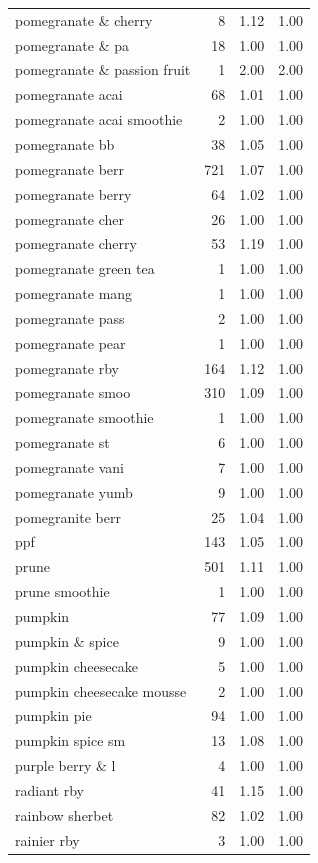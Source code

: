 \begin{table}
\begin{tabular}{lrrr}
pomegranate \& cherry & 8 & 1.12 & 1.00 \\
pomegranate \& pa & 18 & 1.00 & 1.00 \\
pomegranate \& passion fruit & 1 & 2.00 & 2.00 \\
pomegranate acai & 68 & 1.01 & 1.00 \\
pomegranate acai smoothie & 2 & 1.00 & 1.00 \\
pomegranate bb & 38 & 1.05 & 1.00 \\
pomegranate berr & 721 & 1.07 & 1.00 \\
pomegranate berry & 64 & 1.02 & 1.00 \\
pomegranate cher & 26 & 1.00 & 1.00 \\
pomegranate cherry & 53 & 1.19 & 1.00 \\
pomegranate green tea & 1 & 1.00 & 1.00 \\
pomegranate mang & 1 & 1.00 & 1.00 \\
pomegranate pass & 2 & 1.00 & 1.00 \\
pomegranate pear & 1 & 1.00 & 1.00 \\
pomegranate rby & 164 & 1.12 & 1.00 \\
pomegranate smoo & 310 & 1.09 & 1.00 \\
pomegranate smoothie & 1 & 1.00 & 1.00 \\
pomegranate st & 6 & 1.00 & 1.00 \\
pomegranate vani & 7 & 1.00 & 1.00 \\
pomegranate yumb & 9 & 1.00 & 1.00 \\
pomegranite berr & 25 & 1.04 & 1.00 \\
ppf & 143 & 1.05 & 1.00 \\
prune & 501 & 1.11 & 1.00 \\
prune smoothie & 1 & 1.00 & 1.00 \\
pumpkin & 77 & 1.09 & 1.00 \\
pumpkin \& spice & 9 & 1.00 & 1.00 \\
pumpkin cheesecake & 5 & 1.00 & 1.00 \\
pumpkin cheesecake mousse & 2 & 1.00 & 1.00 \\
pumpkin pie & 94 & 1.00 & 1.00 \\
pumpkin spice sm & 13 & 1.08 & 1.00 \\
purple berry \& l & 4 & 1.00 & 1.00 \\
radiant rby & 41 & 1.15 & 1.00 \\
rainbow sherbet & 82 & 1.02 & 1.00 \\
rainier rby & 3 & 1.00 & 1.00 \\

\end{tabular}
\end{table}
